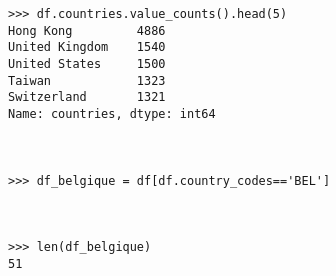 \begin{question}[2 pts]
\begin{mybox}
\begin{reponse}
\begin{verbatim}
>>> df.countries.value_counts().head(5)
Hong Kong         4886
United Kingdom    1540
United States     1500
Taiwan            1323
Switzerland       1321
Name: countries, dtype: int64



>>> df_belgique = df[df.country_codes=='BEL']



>>> len(df_belgique)
51
\end{verbatim}
\end{reponse}
\end{mybox}
\end{question}






